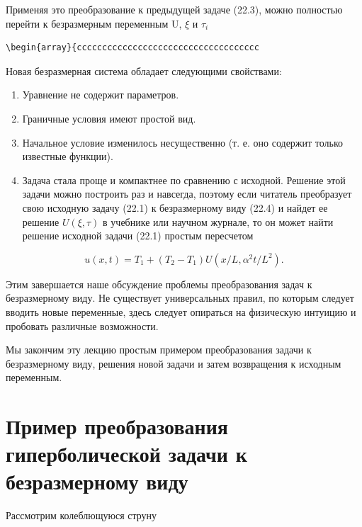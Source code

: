 \documentclass[
  ukrainian,
]{article}
\begin{document}
Применяя это преобразование к предыдущей задаче (22.3), можно полностью
перейти к безразмерным переменным U, \(\xi\) и \(\tau_i\)

\begin{verbatim}
\begin{array}{cccccccccccccccccccccccccccccccccccc
\end{verbatim}

Новая безразмерная система обладает следующими свойствами:

\begin{enumerate}
\def\labelenumi{\arabic{enumi}.}
\item
  Уравнение не содержит параметров.
\item
  Граничные условия имеют простой вид.
\item
  Начальное условие изменилось несущественно (т. е. оно содержит только
  известные функции).
\item
  Задача стала проще и компактнее по сравнению с исходной. Решение этой
  задачи можно построить раз и навсегда, поэтому если читатель
  преобразует свою исходную задачу (22.1) к безразмерному виду (22.4) и
  найдет ее решение \(U(\xi, \tau)\) в учебнике или научном журнале, то
  он может найти решение исходной задачи (22.1) простым пересчетом
\end{enumerate}

\[
u(x, t) = T_1 + (T_2 - T_1) U(x/L, \alpha^2 t/L^2).
\]

Этим завершается наше обсуждение проблемы преобразования задач к
безразмерному виду. Не существует универсальных правил, по которым
следует вводить новые переменные, здесь следует опираться на физическую
интуицию и пробовать различные возможности.

Мы закончим эту лекцию простым примером преобразования задачи к
безразмерному виду, решения новой задачи и затем возвращения к исходным
переменным.

\section{Пример преобразования гиперболической задачи к безразмерному
виду}\label{ux43fux440ux438ux43cux435ux440-ux43fux440ux435ux43eux431ux440ux430ux437ux43eux432ux430ux43dux438ux44f-ux433ux438ux43fux435ux440ux431ux43eux43bux438ux447ux435ux441ux43aux43eux439-ux437ux430ux434ux430ux447ux438-ux43a-ux431ux435ux437ux440ux430ux437ux43cux435ux440ux43dux43eux43cux443-ux432ux438ux434ux443}

Рассмотрим колеблющуюся струну
\end{document}
